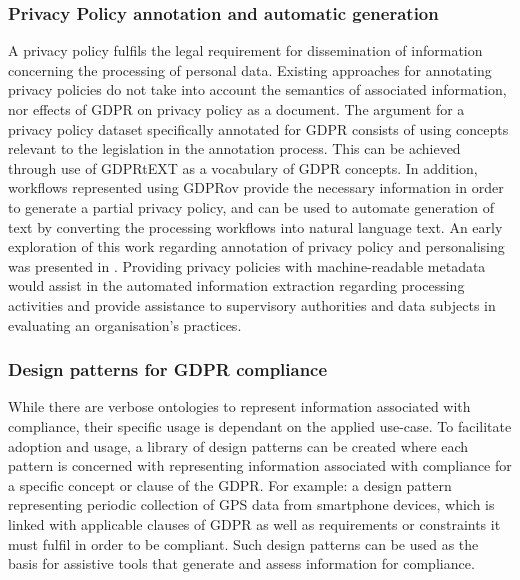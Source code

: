 \subsubsection*{Privacy Policy annotation and automatic generation}
A privacy policy fulfils the legal requirement for dissemination of information concerning the processing of personal data. Existing approaches for annotating privacy policies \cite{harkous_polisis_2018} do not take into account the semantics of associated information, nor effects of GDPR on privacy policy as a document. The argument for a privacy policy dataset specifically annotated for GDPR \cite{galle_case_2019} consists of using concepts relevant to the legislation in the annotation process. This can be achieved through use of GDPRtEXT as a vocabulary of GDPR concepts. In addition, workflows represented using GDPRov provide the necessary information in order to generate a partial privacy policy, and can be used to automate generation of text by converting the processing workflows into natural language text. An early exploration of this work regarding annotation of  privacy policy and personalising was presented in \cite{pandit_personalised_2018}.
Providing privacy policies with machine-readable metadata would assist in the automated information extraction regarding processing activities and provide assistance to supervisory authorities and data subjects in evaluating an organisation's practices.

\subsubsection*{Design patterns for GDPR compliance}
While there are verbose ontologies to represent information associated with compliance, their specific usage is dependant on the applied use-case. To facilitate adoption and usage, a library of design patterns can be created where each pattern is concerned with representing information associated with compliance for a specific concept or clause of the GDPR. For example: a design pattern representing periodic collection of GPS data from smartphone devices, which is linked with applicable clauses of GDPR as well as requirements or constraints it must fulfil in order to be compliant. Such design patterns can be used as the basis for assistive tools that generate and assess information for compliance.


